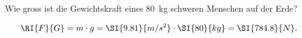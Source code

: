 
\begin{aufgabe}
	Wie gross ist die Gewichtskraft eines \SI{80}{kg} schweren Menschen auf der Erde?
	\begin{loesung}
		\begin{eqnarray*}
			\RI{F}{G}=m\cdot g=\SI{9.81}{m/s^2}\cdot\SI{80}{kg}=\SI{784.8}{N}.
		\end{eqnarray*}
	\end{loesung}
\end{aufgabe}
